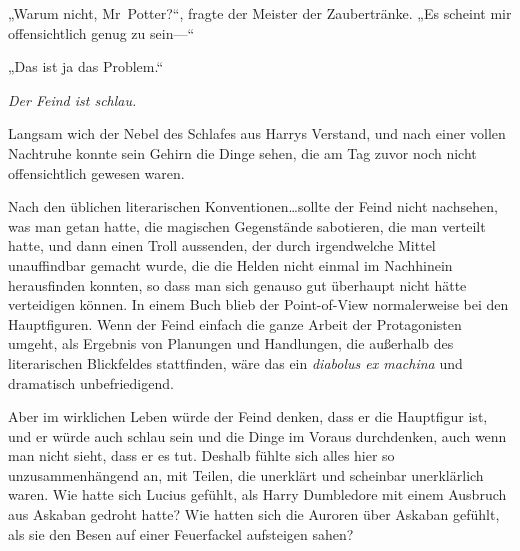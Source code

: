 „Warum nicht, Mr~Potter?“, fragte der Meister der Zaubertränke. „Es scheint mir offensichtlich genug zu sein—“

„Das ist ja das Problem.“

\emph{Der Feind ist schlau.}

Langsam wich der Nebel des Schlafes aus Harrys Verstand, und nach einer vollen Nachtruhe konnte sein Gehirn die Dinge sehen, die am Tag zuvor noch nicht offensichtlich gewesen waren.

Nach den üblichen literarischen Konventionen…sollte der Feind nicht nachsehen, was man getan hatte, die magischen Gegenstände sabotieren, die man verteilt hatte, und dann einen Troll aussenden, der durch irgendwelche Mittel unauffindbar gemacht wurde, die die Helden nicht einmal im Nachhinein herausfinden konnten, so dass man sich genauso gut überhaupt nicht hätte verteidigen können. In einem Buch blieb der Point-of-View normalerweise bei den Hauptfiguren. Wenn der Feind einfach die ganze Arbeit der Protagonisten umgeht, als Ergebnis von Planungen und Handlungen, die außerhalb des literarischen Blickfeldes stattfinden, wäre das ein \emph{diabolus ex machina} und dramatisch unbefriedigend.

Aber im wirklichen Leben würde der Feind denken, dass er die Hauptfigur ist, und er würde auch schlau sein und die Dinge im Voraus durchdenken, auch wenn man nicht sieht, dass er es tut. Deshalb fühlte sich alles hier so unzusammenhängend an, mit Teilen, die unerklärt und scheinbar unerklärlich waren.
Wie hatte sich Lucius gefühlt, als Harry Dumbledore mit einem Ausbruch aus Askaban gedroht hatte? Wie hatten sich die Auroren über Askaban gefühlt, als sie den Besen auf einer Feuerfackel aufsteigen sahen?

